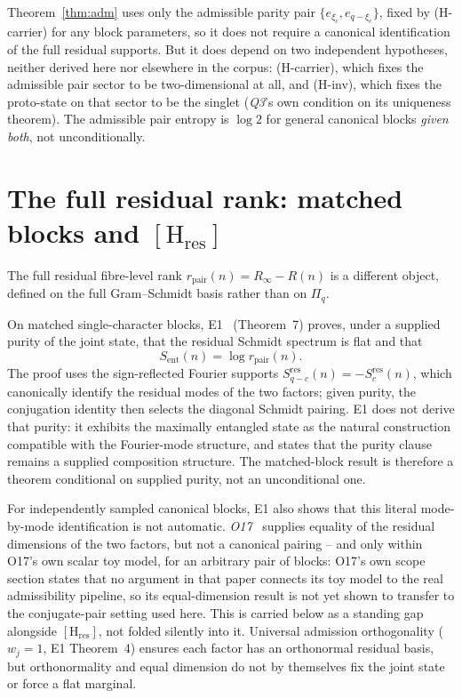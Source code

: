 \documentclass[11pt]{article}
\newcommand{\Sent}{S_{\mathrm{ent}}}
\newcommand{\rpair}{r_{\mathrm{pair}}}
\newcommand{\Hres}{[\mathrm{H}_{\mathrm{res}}]}
\begin{document}
    Theorem~\ref{thm:adm} uses only the admissible parity pair $\{e_{\xi_c},e_{q-\xi_c}\}$,
    fixed by (H-carrier) for any block parameters, so it does not require a canonical
    identification of the full residual supports.
    But it does depend on two independent hypotheses, neither derived here nor elsewhere in
    the corpus: (H-carrier), which fixes the admissible pair sector to be two-dimensional at
    all, and (H-inv), which fixes the proto-state on that sector to be the singlet
    (\emph{Q3}'s own condition on its uniqueness theorem).
    The admissible pair entropy is $\log 2$ for general canonical blocks \emph{given both},
    not unconditionally.

  \section{The full residual rank: matched blocks and \texorpdfstring{$\Hres$}{[H res]}}
    \label{sec:residual}

    The full residual fibre-level rank $\rpair(n)=R_\infty-R(n)$ is a different object,
    defined on the full Gram--Schmidt basis rather than on $\Pi_q$.

    On matched single-character blocks, E1~\cite{Beau2026ent1} (Theorem~7) proves, under a
    supplied purity of the joint state, that the residual Schmidt spectrum is flat and that
    \[
      \Sent(n) = \log \rpair(n).
    \]
    The proof uses the sign-reflected Fourier supports $S_{q-c}^{\mathrm{res}}(n)
  = -S_c^{\mathrm{res}}(n)$, which canonically identify the residual modes of the two factors;
    given purity, the conjugation identity then selects the diagonal Schmidt pairing.
    E1 does not derive that purity: it exhibits the maximally entangled state as the natural
    construction compatible with the Fourier-mode structure, and states that the purity clause
    remains a supplied composition structure.
    The matched-block result is therefore a theorem conditional on supplied purity, not an
    unconditional one.

    For independently sampled canonical blocks, E1 also shows that this literal mode-by-mode
    identification is not automatic.
    \emph{O17}~\cite{Beau2026a21} supplies equality of the residual dimensions of the two
    factors, but not a canonical pairing -- and only within O17's own scalar toy model, for
    an arbitrary pair of blocks: O17's own scope section states that no argument in that paper
    connects its toy model to the real admissibility pipeline, so its equal-dimension result is
    not yet shown to transfer to the conjugate-pair setting used here.
    This is carried below as a standing gap alongside $\Hres$, not folded silently into it.
    Universal admission orthogonality ($w_j=1$, E1 Theorem~4) ensures each factor has an
    orthonormal residual basis, but orthonormality and equal dimension do not by themselves
    fix the joint state or force a flat marginal.
\end{document}

